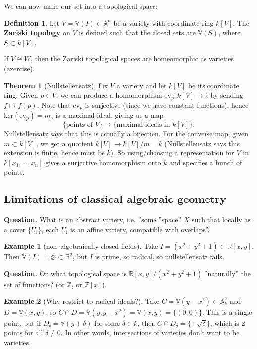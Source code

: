 \documentclass{article}
\theoremstyle{definition}
\newtheorem{theorem}{Theorem}[section]
\newtheorem{example}{Example}[section]
\newtheorem{defn}{Definition}[section]
\begin{document}
We can now make our set into a topological space:
\begin{defn}
    Let $V = \mathbb{V}(I) \subset \mathbb{A}^n$ be a variety with coordinate ring $k[V]$. The \textbf{Zariski topology} on $V$ is defined such that the closed sets are $\mathbb{V}(S)$, where $S \subset k[V]$.
\end{defn}
If $V \cong W$, then the Zariski topological spaces are homeomorphic as varieties (exercise).

\begin{theorem}[Nullstellensatz]
    Fix $V$ a variety and let $k[V]$ be its coordinate ring. Given $p \in V$, we can produce a homomorphism $\text{ev}_p : k[V] \to k$ by sending $f \mapsto f(p)$. Note that $\text{ev}_p$ is surjective (since we have constant functions), hence $\text{ker}(\text{ev}_p) = m_p$ is a maximal ideal, giving us a map \[
        \{\text{points of }V\} \rightarrow \{\text{maximal ideals in }k[V]\}.
    \]
    Nullstellensatz says that this is actually a bijection. For the converse map, given $m \subset k[V]$, we get a quotient $k[V] \to k[V]/m = k$ (Nullstellensatz says this extension is finite, hence must be $k$). So using/choosing a representation for $V$ in $k[x_1,\ldots,x_n]$ gives a surjective homomorphism onto $k$ and specifies a bunch of points.
\end{theorem}
\subsection{Limitations of classical algebraic geometry}
\textbf{Question.} What is an abstract variety, i.e. ''some ''space'' $X$ such that locally as a cover $\{U_i\}$, each $U_i$ is an affine variety, compatible with overlaps''. 

\begin{example}[non--algebraically closed fields]
    Take $I = (x^2+y^2+1) \subset \mathbb{R}[x,y]$. Then $\mathbb{V}(I) = \varnothing \subset \mathbb{R}^2$, but $I$ is prime, so radical, so nullstellensatz fails.
\end{example}

\textbf{Question.} On what topological space is $\mathbb{R}[x,y]/(x^2+y^2+1)$ ''naturally'' the set of functions? (or $\mathbb{Z}$, or $\mathbb{Z}[x]$).

\begin{example}[Why restrict to radical ideals?]
    Take $C = \mathbb{V}(y-x^2) \subset \mathbb{A}_k^2$ and $D = \mathbb{V}(x,y)$, so $C \cap D = \mathbb{V}(y, y-x^2) = \mathbb{V}(x,y) = \{(0,0)\}$. This is a single point, but if $D_\delta = \mathbb{V}(y+\delta)$ for some $\delta \in k$, then $C \cap D_\delta = \{\pm \sqrt{\delta}\}$, which is 2 points for all $\delta \neq 0$. In other words, intersections of varieties don't want to be varieties.
\end{example}
\end{document}
